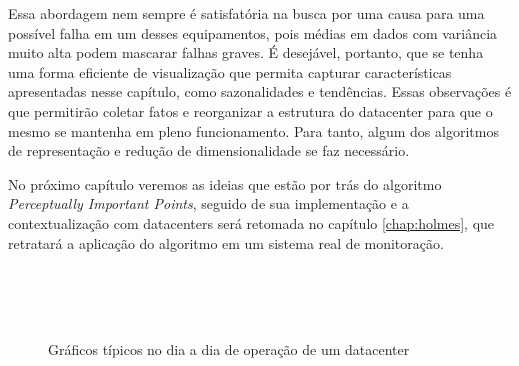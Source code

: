 Essa abordagem nem sempre é satisfatória na busca por uma causa para uma possível falha em um desses equipamentos, pois médias em dados com variância muito alta podem mascarar falhas graves. É desejável, portanto, que se tenha uma forma eficiente de visualização que permita capturar características apresentadas nesse capítulo, como sazonalidades e tendências. Essas observações é que permitirão coletar fatos e reorganizar a estrutura do datacenter para que o mesmo se mantenha em pleno funcionamento. Para tanto, algum dos algoritmos de representação e redução de dimensionalidade se faz necessário. 

No próximo capítulo veremos as ideias que estão por trás do algoritmo \textit{Perceptually Important Points}, seguido de sua implementação e a contextualização com datacenters será retomada no capítulo \ref{chap:holmes}, que retratará a aplicação do algoritmo em um sistema real de monitoração.

\begin{figure}[htb!]
  \begin{center}
    \\
    \\
    \\
    \centering
    \caption{Gráficos típicos no dia a dia de operação de um datacenter}
    \label{fig:series-temporais-datacenter}
  \end{center}
\end{figure}


